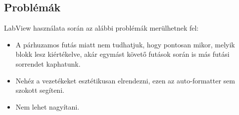 \documentclass[../../main.tex]{subfiles}
\begin{document}
\subsection{Problémák}

LabView használata során az alábbi problémák merülhetnek fel:
\begin{itemize}
  \item A párhuzamos futás miatt nem tudhatjuk, hogy pontosan mikor,
        melyik blokk lesz kiértékelve, akár egymást követő futások során
        is más futási sorrendet kaphatunk.
  \item Nehéz a vezetékeket esztétikusan elrendezni, ezen az auto-formatter
        sem szokott segíteni.
  \item Nem lehet nagyítani.
\end{itemize}
\end{document}
